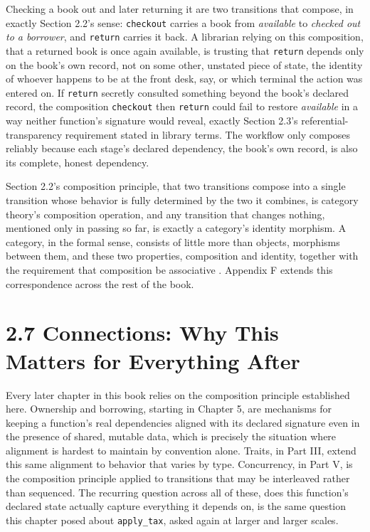 \documentclass[11pt]{book}
\begin{document}
Checking a book out and later returning it are two transitions that compose, in exactly Section 2.2's sense: \texttt{checkout} carries a book from \emph{available} to \emph{checked out to a borrower}, and \texttt{return} carries it back. A librarian relying on this composition, that a returned book is once again available, is trusting that \texttt{return} depends only on the book's own record, not on some other, unstated piece of state, the identity of whoever happens to be at the front desk, say, or which terminal the action was entered on. If \texttt{return} secretly consulted something beyond the book's declared record, the composition \texttt{checkout} then \texttt{return} could fail to restore \emph{available} in a way neither function's signature would reveal, exactly Section 2.3's referential-transparency requirement stated in library terms. The workflow only composes reliably because each stage's declared dependency, the book's own record, is also its complete, honest dependency.

\begin{categorybox}
Section 2.2's composition principle, that two transitions compose into a single transition whose behavior is fully determined by the two it combines, is category theory's composition operation, and any transition that changes nothing, mentioned only in passing so far, is exactly a category's identity morphism. A category, in the formal sense, consists of little more than objects, morphisms between them, and these two properties, composition and identity, together with the requirement that composition be associative \cite{milewski2019}. Appendix F extends this correspondence across the rest of the book.
\end{categorybox}

\section*{2.7 Connections: Why This Matters for Everything After}

Every later chapter in this book relies on the composition principle established here. Ownership and borrowing, starting in Chapter 5, are mechanisms for keeping a function's real dependencies aligned with its declared signature even in the presence of shared, mutable data, which is precisely the situation where alignment is hardest to maintain by convention alone. Traits, in Part III, extend this same alignment to behavior that varies by type. Concurrency, in Part V, is the composition principle applied to transitions that may be interleaved rather than sequenced. The recurring question across all of these, does this function's declared state actually capture everything it depends on, is the same question this chapter posed about \texttt{apply\_tax}, asked again at larger and larger scales.
\end{document}
